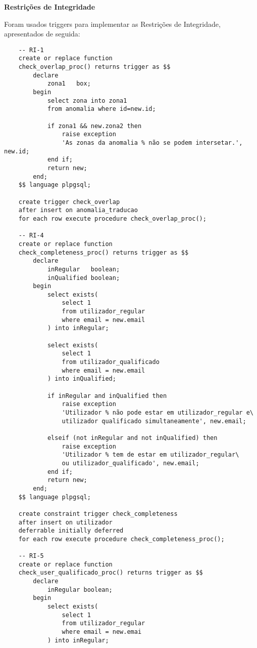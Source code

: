 \documentclass[12pt]{report}
\begin{document}
    \Large
    \textbf{Restrições de Integridade}\\
    \normalsize
    \par Foram usados triggers para implementar as Restrições de Integridade, apresentados de seguida:
    \footnotesize
    \begin{verbatim}
    -- RI-1
    create or replace function
    check_overlap_proc() returns trigger as $$
        declare
            zona1   box;
        begin
            select zona into zona1
            from anomalia where id=new.id;

            if zona1 && new.zona2 then
                raise exception
                'As zonas da anomalia % não se podem intersetar.', new.id;
            end if;
            return new;
        end;
    $$ language plpgsql;

    create trigger check_overlap
    after insert on anomalia_traducao
    for each row execute procedure check_overlap_proc();

    -- RI-4
    create or replace function
    check_completeness_proc() returns trigger as $$
        declare
            inRegular   boolean;
            inQualified boolean;
        begin
            select exists(
                select 1
                from utilizador_regular
                where email = new.email
            ) into inRegular;

            select exists(
                select 1
                from utilizador_qualificado
                where email = new.email
            ) into inQualified;

            if inRegular and inQualified then
                raise exception
                'Utilizador % não pode estar em utilizador_regular e\
                utilizador qualificado simultaneamente', new.email;

            elseif (not inRegular and not inQualified) then
                raise exception
                'Utilizador % tem de estar em utilizador_regular\
                ou utilizador_qualificado', new.email;
            end if;
            return new;
        end;
    $$ language plpgsql;

    create constraint trigger check_completeness
    after insert on utilizador
    deferrable initially deferred
    for each row execute procedure check_completeness_proc();

    -- RI-5
    create or replace function
    check_user_qualificado_proc() returns trigger as $$
        declare
            inRegular boolean;
        begin
            select exists(
                select 1
                from utilizador_regular
                where email = new.emai
            ) into inRegular;


\end{verbatim}
\end{document}
